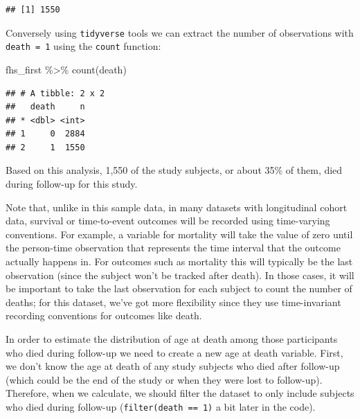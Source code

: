 \documentclass[
]{book}
\newenvironment{Shaded}{\begin{snugshade}}{\end{snugshade}}
\newcommand{\FunctionTok}[1]{\textcolor[rgb]{0.00,0.00,0.00}{#1}}
\newcommand{\NormalTok}[1]{#1}
\newcommand{\SpecialCharTok}[1]{\textcolor[rgb]{0.00,0.00,0.00}{#1}}
\begin{document}
\begin{Shaded}
\end{Shaded}

\begin{verbatim}
## [1] 1550
\end{verbatim}

Conversely using \texttt{tidyverse} tools we can extract the number of observations with \texttt{death\ =\ 1} using the \texttt{count} function:

\begin{Shaded}
\begin{Highlighting}[]
\NormalTok{fhs\_first }\SpecialCharTok{\%\textgreater{}\%} 
  \FunctionTok{count}\NormalTok{(death) }
\end{Highlighting}
\end{Shaded}

\begin{verbatim}
## # A tibble: 2 x 2
##   death     n
## * <dbl> <int>
## 1     0  2884
## 2     1  1550
\end{verbatim}

Based on this analysis, 1,550 of the study subjects, or about 35\% of them, died during follow-up for this study.

Note that, unlike in this sample data, in many datasets with longitudinal cohort data, survival or time-to-event outcomes will be recorded using time-varying conventions. For example, a variable for mortality will take the value of zero until the person-time observation that represents the time interval that the outcome actually happens in. For outcomes such as mortality this will typically be the last observation (since the subject won't be tracked after death). In those cases, it will be important to take the last observation for each subject to count the number of deaths; for this dataset, we've got more flexibility since they use time-invariant recording conventions for outcomes like death.

In order to estimate the distribution of age at death among those participants who died during follow-up we need to create a new age at death variable. First, we don't know the age at death of any study subjects who died after follow-up (which could be the end of the study or when they were lost to follow-up). Therefore, when we calculate, we should filter the dataset to only include subjects who died during follow-up (\texttt{filter(death\ ==\ 1)} a bit later in the code).
\end{document}
